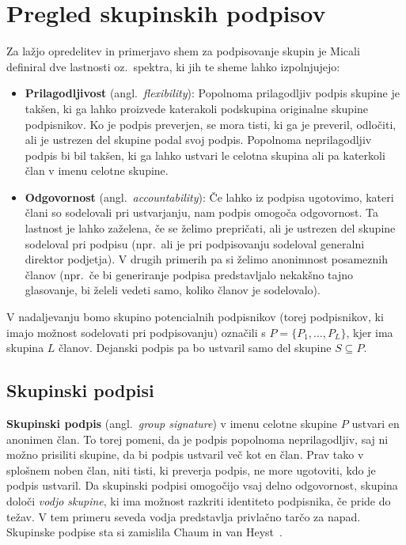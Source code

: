 \section{Pregled skupinskih podpisov}
\label{sec:skpine}
Za lažjo opredelitev in primerjavo shem za podpisovanje skupin je Micali~\cite{micali2001asm}
definiral dve lastnosti oz.\ spektra, ki jih te sheme lahko izpolnjujejo:
\begin{itemize}
    \item \textbf{Prilagodljivost} (angl.\ \textit{flexibility}): Popolnoma prilagodljiv podpis skupine
        je takšen, ki ga lahko proizvede katerakoli podskupina originalne skupine podpisnikov. Ko je podpis 
        preverjen, se mora tisti, ki ga je preveril, odločiti, ali je ustrezen del skupine podal svoj podpis. 
        Popolnoma neprilagodljiv podpis bi bil takšen, ki ga lahko ustvari le celotna skupina ali pa
        katerkoli član v imenu celotne skupine.
    \item \textbf{Odgovornost} (angl.\ \textit{accountability}): Če lahko iz podpisa ugotovimo, kateri člani 
        so sodelovali pri ustvarjanju, nam podpis omogoča odgovornost. Ta lastnost je lahko zaželena, če 
        se želimo prepričati, ali je ustrezen del skupine sodeloval pri podpisu (npr.\ ali je pri podpisovanju 
        sodeloval generalni direktor podjetja). V drugih primerih pa si želimo anonimnost posameznih članov 
        (npr.\ če bi generiranje podpisa predstavljalo nekakšno tajno glasovanje, bi želeli vedeti samo, koliko 
        članov je sodelovalo).
\end{itemize}

V nadaljevanju bomo skupino potencialnih podpisnikov (torej podpisnikov, ki imajo možnost sodelovati pri 
podpisovanju) označili s $P = \{ P_1, \dots, P_L \}$, kjer ima skupina $L$ članov. Dejanski podpis pa bo 
ustvaril samo del skupine $S \subseteq P$.

\subsection{Skupinski podpisi}
\textbf{Skupinski podpis} (angl.\ \textit{group signature}) v imenu celotne skupine $P$ ustvari en 
anonimen član. To torej pomeni, da je podpis popolnoma neprilagodljiv, saj ni možno prisiliti skupine,
da bi podpis ustvaril več kot en član. Prav tako v splošnem noben član, niti tisti, ki preverja podpis,
ne more ugotoviti, kdo je podpis ustvaril. Da skupinski podpisi omogočijo vsaj delno odgovornost, 
skupina določi \textit{vodjo skupine}, ki ima možnost razkriti identiteto podpisnika, če pride do 
težav. V tem primeru seveda vodja predstavlja privlačno tarčo za napad. Skupinske podpise sta si
zamislila Chaum in van Heyst~\cite{chaum1991group}.

